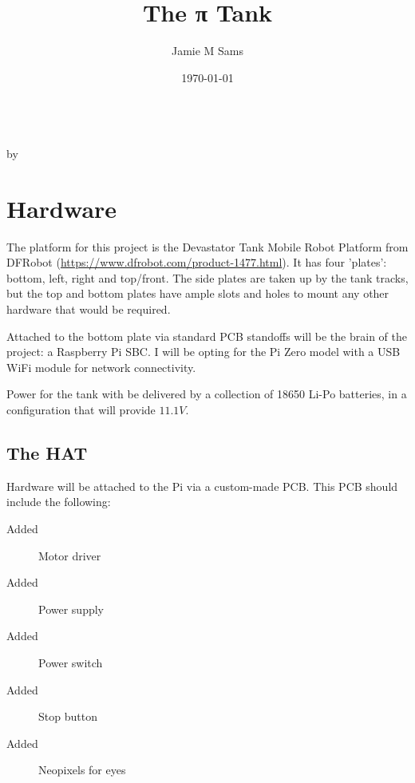 \documentclass[a4paper,openany,nomultitoc]{dndbook}
\title{The π Tank}
\author{Jamie M Sams}
\date{\today}
\begin{document}
\DndSetThemeColor[DmgLavender]

\frontmatter

\begin{titlepage}
	\vspace*{\fill}
	\centering
	{\Huge \thetitle}\\
	\vspace*{\fill}
	{\large by \theauthor}
\end{titlepage}


\mainmatter%

\FloatBarrier
\chapter{Hardware}
\FloatBarrier
\begin{multicols*}{2}

The platform for this project is the Devastator Tank Mobile Robot Platform from DFRobot (\url{https://www.dfrobot.com/product-1477.html}).  It has four 'plates': bottom, left, right and top/front.  The side plates are taken up by the tank tracks, but the top and bottom plates have ample slots and holes to mount any other hardware that would be required.

Attached to the bottom plate via standard PCB standoffs will be the brain of the project: a Raspberry Pi SBC.  I will be opting for the Pi Zero model with a USB WiFi module for network connectivity.

Power for the tank with be delivered by a collection of 18650 Li-Po batteries, in a configuration that will provide $11.1V$.

\section{The HAT}

Hardware will be attached to the Pi via a custom-made PCB.  This PCB should include the following:
\begin{description}
\item[Added]Motor driver
\item[Added]Power supply
\item[Added]Power switch
\item[Added]Stop button
\item[Added]Neopixels for eyes
\end{description}

\end{multicols*}
\end{document}
